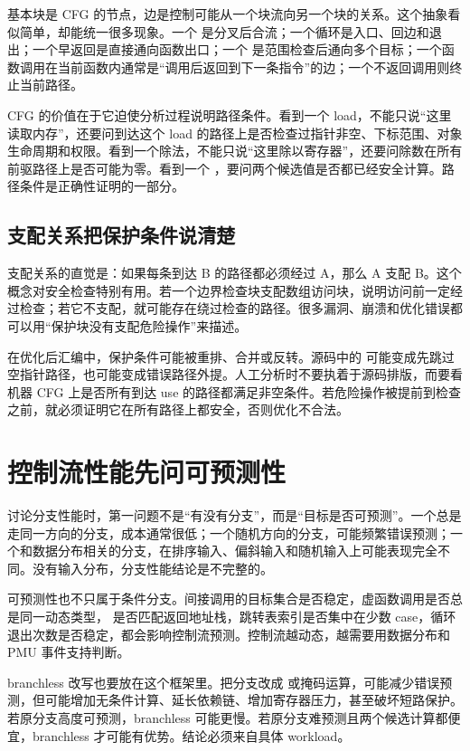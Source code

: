 基本块是 CFG 的节点，边是控制可能从一个块流向另一个块的关系。这个抽象看似简单，却能统一很多现象。一个  是分叉后合流；一个循环是入口、回边和退出；一个早返回是直接通向函数出口；一个  是范围检查后通向多个目标；一个函数调用在当前函数内通常是“调用后返回到下一条指令”的边；一个不返回调用则终止当前路径。

CFG 的价值在于它迫使分析过程说明路径条件。看到一个 load，不能只说“这里读取内存”，还要问到达这个 load 的路径上是否检查过指针非空、下标范围、对象生命周期和权限。看到一个除法，不能只说“这里除以寄存器”，还要问除数在所有前驱路径上是否可能为零。看到一个 ，要问两个候选值是否都已经安全计算。路径条件是正确性证明的一部分。

\subsection{支配关系把保护条件说清楚}

支配关系的直觉是：如果每条到达 B 的路径都必须经过 A，那么 A 支配 B。这个概念对安全检查特别有用。若一个边界检查块支配数组访问块，说明访问前一定经过检查；若它不支配，就可能存在绕过检查的路径。很多漏洞、崩溃和优化错误都可以用“保护块没有支配危险操作”来描述。

在优化后汇编中，保护条件可能被重排、合并或反转。源码中的  可能变成先跳过空指针路径，也可能变成错误路径外提。人工分析时不要执着于源码排版，而要看机器 CFG 上是否所有到达 use 的路径都满足非空条件。若危险操作被提前到检查之前，就必须证明它在所有路径上都安全，否则优化不合法。

\section{控制流性能先问可预测性}

讨论分支性能时，第一问题不是“有没有分支”，而是“目标是否可预测”。一个总是走同一方向的分支，成本通常很低；一个随机方向的分支，可能频繁错误预测；一个和数据分布相关的分支，在排序输入、偏斜输入和随机输入上可能表现完全不同。没有输入分布，分支性能结论是不完整的。

可预测性也不只属于条件分支。间接调用的目标集合是否稳定，虚函数调用是否总是同一动态类型， 是否匹配返回地址栈，跳转表索引是否集中在少数 case，循环退出次数是否稳定，都会影响控制流预测。控制流越动态，越需要用数据分布和 PMU 事件支持判断。

branchless 改写也要放在这个框架里。把分支改成  或掩码运算，可能减少错误预测，但可能增加无条件计算、延长依赖链、增加寄存器压力，甚至破坏短路保护。若原分支高度可预测，branchless 可能更慢。若原分支难预测且两个候选计算都便宜，branchless 才可能有优势。结论必须来自具体 workload。

